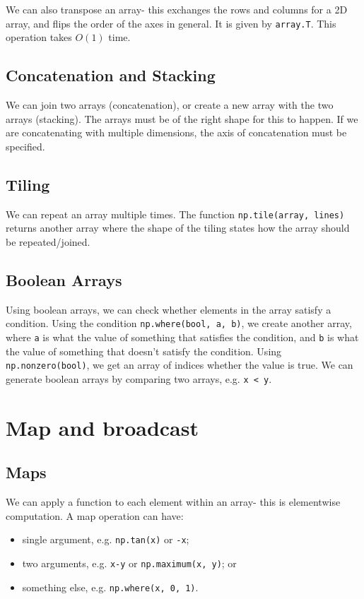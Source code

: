 \documentclass[a4paper, openany]{memoir}
\begin{document}
    We can also transpose an array- this exchanges the rows and columns for a 2D array, and flips the order of the axes in general. It is given by \texttt{array.T}. This operation takes $O(1)$ time.

    \subsection{Concatenation and Stacking}
    We can join two arrays (concatenation), or create a new array with the two arrays (stacking). The arrays must be of the right shape for this to happen. If we are concatenating with multiple dimensions, the axis of concatenation must be specified.

    \subsection{Tiling}
    We can repeat an array multiple times. The function \texttt{np.tile(array, lines)} returns another array where the shape of the tiling states how the array should be repeated/joined.

    \subsection{Boolean Arrays} Using boolean arrays, we can check whether elements in the array satisfy a condition. Using the condition \texttt{np.where(bool, a, b)}, we create another array, where \texttt{a} is what the value of something that satisfies the condition, and \texttt{b} is what the value of something that doesn't satisfy the condition. Using \texttt{np.nonzero(bool)}, we get an array of indices whether the value is true. We can generate boolean arrays by comparing two arrays, e.g. \texttt{x < y}.

    \section{Map and broadcast}
    \subsection{Maps}
    We can apply a function to each element within an array- this is elementwise computation. A map operation can have:
    \begin{itemize}
        \item single argument, e.g. \texttt{np.tan(x)} or \texttt{-x};
        \item two arguments, e.g. \texttt{x-y} or \texttt{np.maximum(x, y)}; or
        \item something else, e.g. \texttt{np.where(x, 0, 1)}.
    \end{itemize}
\end{document}
